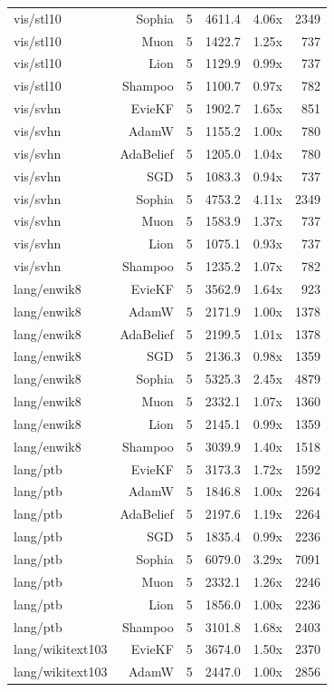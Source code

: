 \begin{table}[t]
\begin{tabular}{lrrrrr}
vis/stl10 & Sophia & 5 & 4611.4 & 4.06x & 2349 \\
vis/stl10 & Muon & 5 & 1422.7 & 1.25x & 737 \\
vis/stl10 & Lion & 5 & 1129.9 & 0.99x & 737 \\
vis/stl10 & Shampoo & 5 & 1100.7 & 0.97x & 782 \\
vis/svhn & EvieKF & 5 & 1902.7 & 1.65x & 851 \\
vis/svhn & AdamW & 5 & 1155.2 & 1.00x & 780 \\
vis/svhn & AdaBelief & 5 & 1205.0 & 1.04x & 780 \\
vis/svhn & SGD & 5 & 1083.3 & 0.94x & 737 \\
vis/svhn & Sophia & 5 & 4753.2 & 4.11x & 2349 \\
vis/svhn & Muon & 5 & 1583.9 & 1.37x & 737 \\
vis/svhn & Lion & 5 & 1075.1 & 0.93x & 737 \\
vis/svhn & Shampoo & 5 & 1235.2 & 1.07x & 782 \\
lang/enwik8 & EvieKF & 5 & 3562.9 & 1.64x & 923 \\
lang/enwik8 & AdamW & 5 & 2171.9 & 1.00x & 1378 \\
lang/enwik8 & AdaBelief & 5 & 2199.5 & 1.01x & 1378 \\
lang/enwik8 & SGD & 5 & 2136.3 & 0.98x & 1359 \\
lang/enwik8 & Sophia & 5 & 5325.3 & 2.45x & 4879 \\
lang/enwik8 & Muon & 5 & 2332.1 & 1.07x & 1360 \\
lang/enwik8 & Lion & 5 & 2145.1 & 0.99x & 1359 \\
lang/enwik8 & Shampoo & 5 & 3039.9 & 1.40x & 1518 \\
lang/ptb & EvieKF & 5 & 3173.3 & 1.72x & 1592 \\
lang/ptb & AdamW & 5 & 1846.8 & 1.00x & 2264 \\
lang/ptb & AdaBelief & 5 & 2197.6 & 1.19x & 2264 \\
lang/ptb & SGD & 5 & 1835.4 & 0.99x & 2236 \\
lang/ptb & Sophia & 5 & 6079.0 & 3.29x & 7091 \\
lang/ptb & Muon & 5 & 2332.1 & 1.26x & 2246 \\
lang/ptb & Lion & 5 & 1856.0 & 1.00x & 2236 \\
lang/ptb & Shampoo & 5 & 3101.8 & 1.68x & 2403 \\
lang/wikitext103 & EvieKF & 5 & 3674.0 & 1.50x & 2370 \\
lang/wikitext103 & AdamW & 5 & 2447.0 & 1.00x & 2856 \\

\end{tabular}
\end{table}
